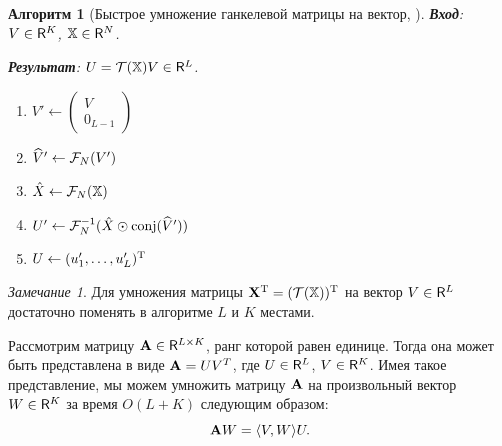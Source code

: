 \documentclass[12pt, specialist, subf,href,colorlinks=true,substylefile = spbu.rtx]{disser}
\newtheorem{algorithm}{Алгоритм}
\theoremstyle{remark}
\newtheorem{remark}{Замечание}
\theoremstyle{definition}
\begin{document}
\begin{algorithm}[Быстрое умножение ганкелевой матрицы на вектор, \cite{Golyandina2013a}]\label{fastprod}
	\textbf{Вход}: $V \in \mathsf{R}^K$, $\mathbb{X} \in \mathsf{R}^N$.
	
	\textbf{Результат}:
	$U = \mathcal{T}(\mathbb{X}) V \in \mathsf{R}^L$.
	
	\begin{enumerate}
		\item
		$V' \leftarrow \begin{pmatrix}
		V \\ 
		0_{L - 1}
		\end{pmatrix} $
		\item
		$\widehat V' \leftarrow \mathcal{F}_N(V')$
		\item
		$\hat X \leftarrow \mathcal{F}_N(\mathbb{X})$
		\item
		$U' \leftarrow \mathcal{F}_N^{-1}(\hat X \odot \text{conj}(\widehat V'))$
		\item
		$U \leftarrow (u'_1, \ldots, u'_L)^{\mathrm{T}}$
	\end{enumerate}
\end{algorithm}
\begin{remark}
	Для умножения матрицы $\mathbf{X}^{\mathrm{T}} = (\mathcal{T}(\mathbb{X}))^{\mathrm{T}}$ на вектор $V \in \mathsf{R}^L$ достаточно поменять в алгоритме $L$ и $K$ местами.
\end{remark}

Рассмотрим матрицу $\mathbf{A} \in \mathsf{R}^{L \times K}$, ранг которой равен единице. Тогда она может быть представлена в виде $\mathbf{A} = U V^T$, где $U \in \mathsf{R}^L$, $V \in \mathsf{R}^K$. Имея такое представление, мы можем умножить матрицу $\mathbf{A}$ на произвольный вектор $W \in \mathsf{R}^K$ за время $O(L + K)$ следующим образом:
\begin{equation*}
\mathbf{A} W = \langle V, W \rangle U.
\end{equation*}
\end{document}
